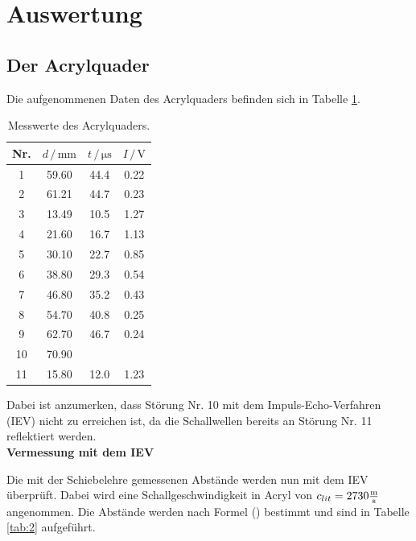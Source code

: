 \newpage
\section{Auswertung}
\subsection{Der Acrylquader}
Die aufgenommenen Daten des Acrylquaders befinden sich in Tabelle \ref{tab:1}.
\begin{table}
    \centering
    \caption{Messwerte des Acrylquaders.}
    \begin{tabular}{c c c c}
        \toprule
        {Nr.} & {$d \, / \, \si{\milli\meter}$} & {$t \, / \, \si{\micro\second} $} & {$I \, / \, \si{\volt}$} \\
        \midrule
     1  & 59.60    &    44.4   &     0.22\\
     2  & 61.21   &    44.7   &     0.23\\
     3  & 13.49   &    10.5   &     1.27\\
     4  & 21.60    &    16.7   &     1.13\\
     5  & 30.10    &    22.7   &     0.85\\
     6  & 38.80    &    29.3   &     0.54\\
     7  & 46.80    &    35.2   &     0.43\\
     8  & 54.70    &    40.8   &     0.25\\
     9  & 62.70    &    46.7   &     0.24\\    
     10 & 70.90    &           &         \\
     11 & 15.80    &    12.0     &     1.23\\
        \bottomrule
    \end{tabular}
    \label{tab:1}
\end{table}

\noindent
Dabei ist anzumerken, dass Störung Nr. 10 mit dem Impuls-Echo-Verfahren (IEV) nicht zu erreichen ist, 
da die Schallwellen bereits an Störung Nr. 11 reflektiert werden. \\

\noindent
\textbf{Vermessung mit dem IEV}

\noindent
Die mit der Schiebelehre gemessenen Abstände werden nun mit dem IEV überprüft.
Dabei wird eine Schallgeschwindigkeit in Acryl von $c_{lit} = 2730 \si[per-mode=fraction]{\meter\per\second}$ angenommen.
Die Abstände werden nach Formel () bestimmt und sind in Tabelle \ref{tab:2} aufgeführt. %

